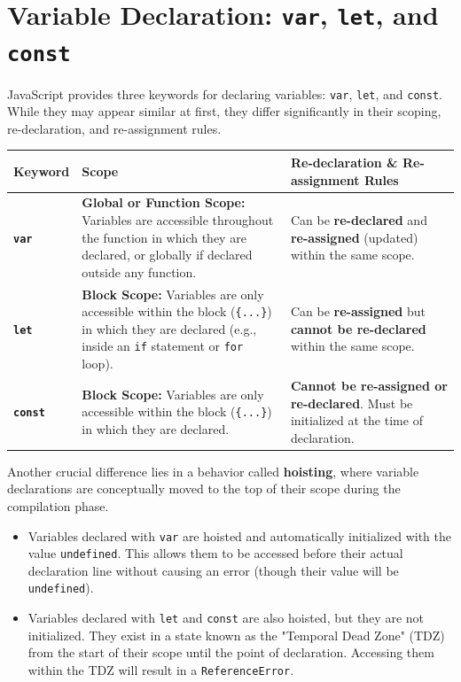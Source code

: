 \documentclass{scrbook}
\begin{document}
\section{Variable Declaration: \texttt{var}, \texttt{let}, and \texttt{const}}

JavaScript provides three keywords for declaring variables: \texttt{var}, \texttt{let}, and \texttt{const}. While they may appear similar at first, they differ significantly in their scoping, re-declaration, and re-assignment rules.

\begin{table}[h!]
    \begin{tabular}{|p{0.1\linewidth}|p{0.5\linewidth}|p{0.4\linewidth}|} \hline
        
        Keyword & Scope & Re-declaration \& Re-assignment Rules \\ \hline
        
        \texttt{\textbf{var}} &
        \textbf{Global or Function Scope:} Variables are accessible throughout the function in which they are declared, or globally if declared outside any function. &
        Can be \textbf{re-declared} and \textbf{re-assigned} (updated) within the same scope. \\ \hline
        
        \texttt{\textbf{let}} &
        \textbf{Block Scope:} Variables are only accessible within the block (\texttt{\{...\}}) in which they are declared (e.g., inside an \texttt{if} statement or \texttt{for} loop). &
        Can be \textbf{re-assigned} but \textbf{cannot be re-declared} within the same scope. \\ \hline
        
        \texttt{\textbf{const}} &
        \textbf{Block Scope:} Variables are only accessible within the block (\texttt{\{...\}}) in which they are declared. &
        \textbf{Cannot be re-assigned or re-declared}. Must be initialized at the time of declaration. \\ \hline
    \end{tabular}
\end{table}

Another crucial difference lies in a behavior called \textbf{hoisting}, where variable declarations are conceptually moved to the top of their scope during the compilation phase.

\begin{itemize}
    \item Variables declared with \texttt{var} are hoisted and automatically initialized with the value \texttt{undefined}. This allows them to be accessed before their actual declaration line without causing an error (though their value will be \texttt{undefined}).
    
    \item Variables declared with \texttt{let} and \texttt{const} are also hoisted, but they are not initialized. They exist in a state known as the "Temporal Dead Zone" (TDZ) from the start of their scope until the point of declaration. Accessing them within the TDZ will result in a \texttt{ReferenceError}.
\end{itemize}
\end{document}
